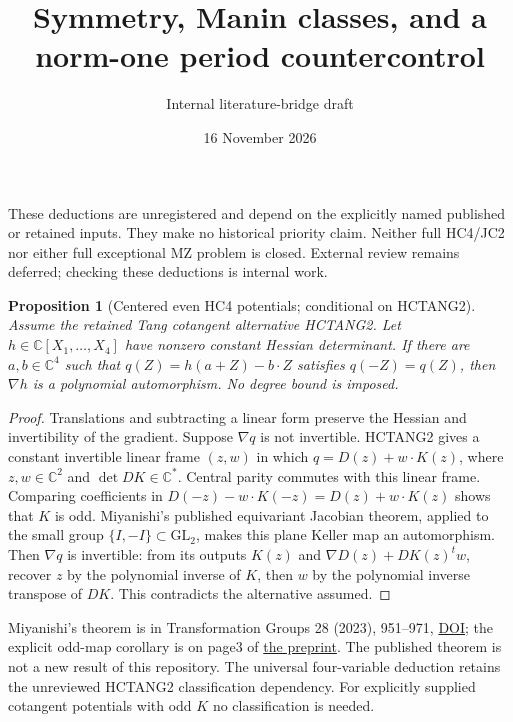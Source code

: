 \documentclass[11pt]{article}
\title{Symmetry, Manin classes, and a norm-one period countercontrol}
\author{Internal literature-bridge draft}
\date{16 November 2026}
\newtheorem{proposition}{Proposition}
\begin{document}
\maketitle
These deductions are unregistered and depend on the explicitly named
published or retained inputs. They make no historical priority claim.
Neither full HC4/JC2 nor either full exceptional MZ problem is closed.
External review remains deferred; checking these deductions is internal work.

\begin{proposition}[Centered even HC4 potentials; conditional on HCTANG2]
Assume the retained Tang cotangent alternative HCTANG2.
Let $h\in\mathbb C[X_1,\ldots,X_4]$ have nonzero constant Hessian determinant.
If there are $a,b\in\mathbb C^4$ such that
$q(Z)=h(a+Z)-b\cdot Z$ satisfies $q(-Z)=q(Z)$, then $\nabla h$ is a
polynomial automorphism. No degree bound is imposed.
\end{proposition}
\begin{proof}
Translations and subtracting a linear form preserve the Hessian and
invertibility of the gradient. Suppose $\nabla q$ is not invertible.
HCTANG2 gives a constant invertible linear frame $(z,w)$ in which
$q=D(z)+w\cdot K(z)$, where $z,w\in\mathbb C^2$ and
$\det DK\in\mathbb C^*$. Central parity commutes with this linear frame.
Comparing coefficients in
$D(-z)-w\cdot K(-z)=D(z)+w\cdot K(z)$ shows that $K$ is odd.
Miyanishi's published equivariant Jacobian theorem, applied to the small
group $\{I,-I\}\subset\mathrm{GL}_2$, makes this plane Keller map an
automorphism. Then $\nabla q$ is invertible: from its outputs
$K(z)$ and $\nabla D(z)+DK(z)^t w$, recover $z$ by the polynomial
inverse of $K$, then $w$ by the polynomial inverse transpose of $DK$.
This contradicts the alternative assumed.
\end{proof}
Miyanishi's theorem is in Transformation Groups 28 (2023), 951--971,
\href{https://doi.org/10.1007/s00031-022-09727-7}{DOI}; the explicit odd-map
corollary is on page3 of \href{https://arxiv.org/abs/2110.06709v1}{the preprint}.
The published theorem is not a new result of this repository.
The universal four-variable deduction retains the unreviewed HCTANG2
classification dependency. For explicitly supplied cotangent potentials
with odd $K$ no classification is needed.
\end{document}
